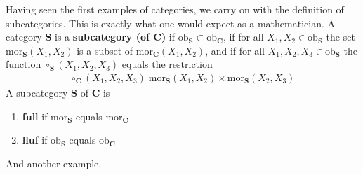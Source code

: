 Having seen the first examples of categories, we carry on with the definition of subcategories.
This is exactly what one would expect as a mathematician.
A category $\mathbf{S}$ is a \textbf{subcategory (of $\mathbf{C}$)} if $\mathrm{ob}_{\mathbf{S}} \subset \mathrm{ob}_{\mathbf{C}}$, if for all $X_{1},X_{2} \in \mathrm{ob}_{\mathbf{S}}$ the set $\mathrm{mor}_{\mathbf{S}}(X_{1},X_{2})$ is a subset of $\mathrm{mor}_{\mathbf{C}}(X_{1},X_{2})$, and if for all $X_{1},X_{2},X_{3} \in \mathrm{ob}_{\mathbf{S}}$ the function $\circ_{\mathbf{S}}(X_{1},X_{2},X_{3})$ equals the restriction
\begin{align*}
  \circ_{\mathbf{C}}(X_{1},X_{2},X_{3})
  \vert
  \mathrm{mor}_{\mathbf{S}}(X_{1},X_{2})
  \times
  \mathrm{mor}_{\mathbf{S}}(X_{2},X_{3})
\end{align*}
A subcategory $\mathbf{S}$ of $\mathbf{C}$ is
\begin{enumerate}
\item[$\bullet$]
\textbf{full} if $\mathrm{mor}_{\mathbf{S}}$ equals $\mathrm{mor}_{\mathbf{C}}$
\item[$\bullet$]
\textbf{lluf} if $\mathrm{ob}_{\mathbf{S}}$ equals $\mathrm{ob}_{\mathbf{C}}$
\end{enumerate}
And another example.
\\
